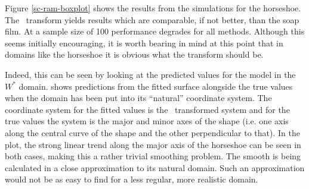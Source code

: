 
Figure \ref{sc-ram-boxplot} shows the results from the simulations for the horseshoe. The \sch\ transform yields results which are comparable, if not better, than the soap film. At a sample size of 100 performance degrades for all methods. Although this seems initially encouraging, it is worth bearing in mind at this point that in domains like the horseshoe it is obvious what the transform should be.

Indeed, this can be seen by looking at the predicted values for the model in the $W^*$ domain.  shows predictions from the fitted surface alongside the true values when the domain has been put into its ``natural'' coordinate system. The coordinate system for the fitted values is the \sch\ transformed system and for the true values the system is the major and minor axes of the shape (i.e. one axis along the central curve of the shape and the other perpendicular to that). In the plot, the strong linear trend along the major axis of the horseshoe can be seen in both cases, making this a rather trivial smoothing problem. The smooth is being calculated in a close approximation to its natural domain. Such an approximation would not be as easy to find for a less regular, more realistic domain.

